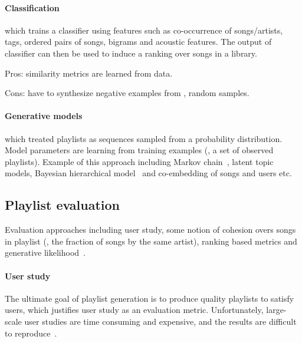 \paragraph{Classification} which trains a classifier using features such as co-occurrence of songs/artists, tags, 
ordered pairs of songs, bigrams and acoustic features. The output of classifier can then be used to induce a ranking over songs in a library.
\begin{description}
\item Pros: similarity metrics are learned from data.
\item Cons: have to synthesize negative examples from \eg, random samples.
\end{description}


\paragraph{Generative models} which treated playlists as sequences sampled from a probability distribution. 
Model parameters are learning from training examples (\ie, a set of observed playlists).
Example of this approach including Markov chain~\cite{chen2012playlist}, latent topic models, Bayesian hierarchical model~\cite{bengroove2017} 
and co-embedding of songs and users etc.


\subsection{Playlist evaluation}
Evaluation approaches including user study, some notion of cohesion overs songs in playlist (\eg, the fraction of songs by the same artist), 
ranking based metrics and generative likelihood~\cite{mcfee2011natural}.

\paragraph{User study}
The ultimate goal of playlist generation is to produce quality playlists to satisfy users, which justifies user study as an evaluation metric.
Unfortunately, large-scale user studies are time consuming and expensive, 
and the results are difficult to reproduce~\cite{mcfee2011natural,recsysbook2015,bonnin2015automated}.


